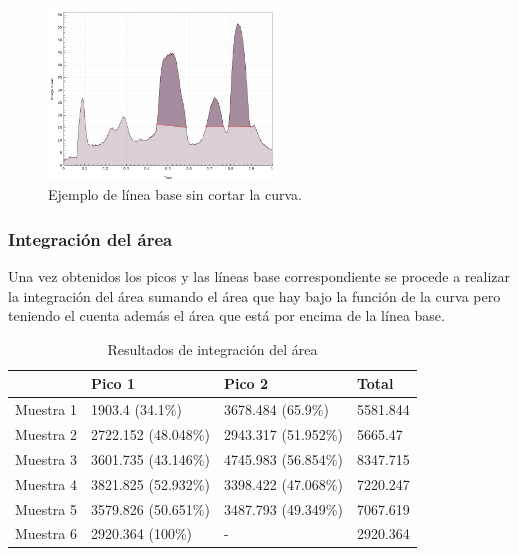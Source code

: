 \begin{figure}[H]
	\vspace{-0.2cm}
	\centering
	\includegraphics[width=230px]{imagenes-jtlc/experimento/baseline}
	\centering
	\caption{Ejemplo de l\'inea base sin cortar la curva.}
	\label{fig:base-line}
	\vspace{-0.15cm}
\end{figure}

\subsubsection{Integraci\'on del \'area}
Una vez obtenidos los picos y las l\'ineas base correspondiente se procede a realizar la integraci\'on del \'area sumando el \'area que hay bajo la funci\'on de la curva pero teniendo el cuenta adem\'as el \'area que est\'a por encima de la l\'inea base.

\begin{table}[H]
\centering
\caption{Resultados de integraci\'on del \'area}
\label{my-label}
\begin{tabular}{|l|l|l|l|}
\hline
          & Pico 1              & Pico 2              & Total    \\ \hline
Muestra 1 & 1903.4 (34.1\%)     & 3678.484 (65.9\%)   & 5581.844 \\ \hline
Muestra 2 & 2722.152 (48.048\%) & 2943.317 (51.952\%) & 5665.47  \\ \hline
Muestra 3 & 3601.735 (43.146\%) & 4745.983 (56.854\%) & 8347.715 \\ \hline
Muestra 4 & 3821.825 (52.932\%) & 3398.422 (47.068\%) & 7220.247 \\ \hline
Muestra 5 & 3579.826 (50.651\%) & 3487.793 (49.349\%) & 7067.619 \\ \hline
Muestra 6 & 2920.364 (100\%)    & -                   & 2920.364 \\ \hline
\end{tabular}
\end{table}
